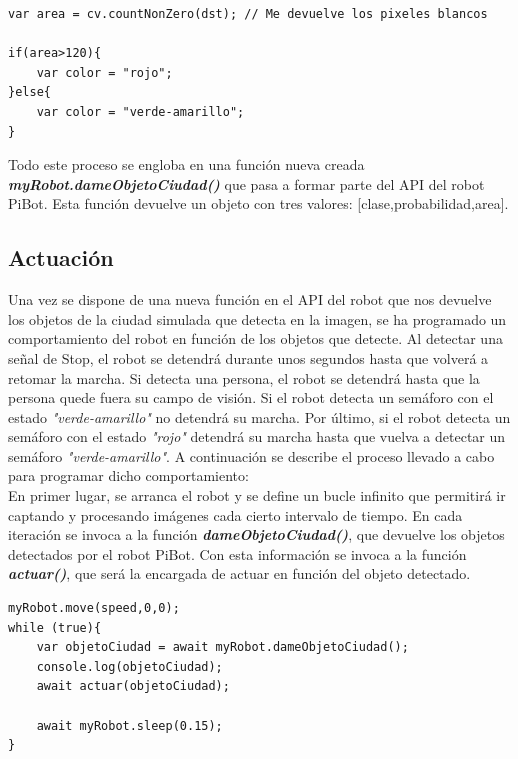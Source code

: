 \documentclass{report}
\begin{document}
\begin{lstlisting}[backgroundcolor = \color{light-gray},
				   aboveskip = 2em,
				   belowskip = 2em,
                   xleftmargin = 2cm,
                   framexleftmargin = 1em,
                   basicstyle=\small]
var area = cv.countNonZero(dst); // Me devuelve los pixeles blancos

if(area>120){
	var color = "rojo";
}else{
	var color = "verde-amarillo";
}
\end{lstlisting}

Todo este proceso se engloba en una función nueva creada \textit{\textbf{myRobot.dameObjetoCiudad()}} que pasa a formar parte del API del robot PiBot. Esta función devuelve un objeto con tres valores: [clase,probabilidad,area].

\newpage
\subsection{Actuación}
Una vez se dispone de una nueva función en el API del robot que nos devuelve los objetos de la ciudad simulada que detecta en la imagen, se ha programado un comportamiento del robot en función de los objetos que detecte. Al detectar una señal de Stop, el robot se detendrá durante unos segundos hasta que volverá a retomar la marcha. Si detecta una persona, el robot se detendrá hasta que la persona quede fuera su campo de visión. Si el robot detecta un semáforo con el estado \textit{"verde-amarillo"} no detendrá su marcha. Por último, si el robot detecta un semáforo con el estado \textit{"rojo"} detendrá su marcha hasta que vuelva a detectar un semáforo \textit{"verde-amarillo"}. A continuación se describe el proceso llevado a cabo para programar dicho comportamiento:
\\

En primer lugar, se arranca el robot y se define un bucle infinito que permitirá ir captando y procesando imágenes cada cierto intervalo de tiempo. En cada iteración se invoca a la función \textit{\textbf{dameObjetoCiudad()}}, que devuelve los objetos detectados por el robot PiBot. Con esta información se invoca a la función \textit{\textbf{actuar()}}, que será la encargada de actuar en función del objeto detectado.

\begin{lstlisting}[backgroundcolor = \color{light-gray},
				   aboveskip = 1em,
				   belowskip = 2em,
                   xleftmargin = 2cm,
                   framexleftmargin = 1em,
                   basicstyle=\small]
myRobot.move(speed,0,0);                   
while (true){
	var objetoCiudad = await myRobot.dameObjetoCiudad();
	console.log(objetoCiudad);
	await actuar(objetoCiudad);

	await myRobot.sleep(0.15);
}
\end{lstlisting}
\end{document}
